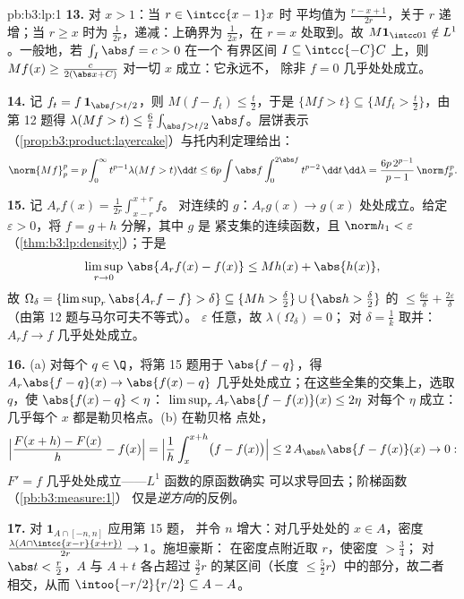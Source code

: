 \begin{solution}{pb:b3:lp:1}
\textbf{13.} 对 $x > 1$：当 $r \in \intcc{x-1}x$ 时
平均值为 $\frac{r - x + 1}{2r}$，关于 $r$ 递增；当 $r
\geq x$ 时为 $\frac1{2r}$，递减：上确界为
$\frac1{2x}$，在 $r = x$ 处取到。故 $M\mathbf 1_{\intcc01}
\notin L^1$。一般地，若 $\int_I\abs f = c > 0$ 在一个
有界区间 $I \subseteq \intcc{-C}C$ 上，则 $Mf(x) \geq
\frac{c}{2(\abs x + C)}$ 对一切 $x$ 成立：它永远不，
除非 $f = 0$ 几乎处处成立。

\textbf{14.} 记 $f_t = f\,\mathbf 1_{\abs f > t/2}$，则
$M(f - f_t) \leq \frac t2$，于是 $\{Mf > t\} \subseteq \{Mf_t
> \frac t2\}$，由第 12 题得 $\lambda(Mf > t) \leq
\frac6t\int_{\abs f > t/2}\abs f$。层饼表示
（\cref{prop:b3:product:layercake}）与托内利定理给出：
\[
\norm{Mf}_p^p = p\int_0^\infty t^{p-1}\lambda(Mf > t)\dd t
\leq 6p\int\abs f\int_0^{2\abs f}t^{p-2}\,\dd t\,\dd\lambda
= \frac{6p\,2^{p-1}}{p-1}\,\norm f_p^p .
\]

\textbf{15.} 记 $A_rf(x) = \frac1{2r}\int_{x-r}^{x+r}f$。
对连续的 $g$：$A_rg(x) \to g(x)$ 处处成立。给定
$\varepsilon > 0$，将 $f = g + h$ 分解，其中 $g$ 是
紧支集的连续函数，且 $\norm h_1 < \varepsilon$
（\cref{thm:b3:lp:density}）；于是
\[
\limsup_{r\to0}\,\abs{A_rf(x) - f(x)} \leq Mh(x) +
\abs{h(x)},
\]
故 $\Omega_\delta = \{\limsup_r\abs{A_rf - f} > \delta\}
\subseteq \{Mh > \tfrac\delta2\} \cup \{\abs h >
\tfrac\delta2\}$ 的 $\leq \frac{6\varepsilon}\delta
+ \frac{2\varepsilon}\delta$（由第 12 题与马尔可夫不等式）。
$\varepsilon$ 任意，故 $\lambda(\Omega_\delta) = 0$；
对 $\delta = \frac1k$ 取并：$A_rf \to f$ 几乎处处成立。

\textbf{16.} (a) 对每个 $q \in \Q$，将第 15 题用于
$\abs{f - q}$，得 $A_r\abs{f - q}(x) \to \abs{f(x) - q}$
几乎处处成立；在这些全集的交集上，选取
$q$，使 $\abs{f(x) - q} < \eta$：
$\limsup_rA_r\abs{f - f(x)}(x) \leq 2\eta$ 对每个 $\eta$ 成立：
几乎每个 $x$ 都是勒贝格点。(b) 在勒贝格
点处，
\[
\Bigl|\frac{F(x + h) - F(x)}h - f(x)\Bigr|
= \Bigl|\frac1h\int_x^{x+h}\bigl(f - f(x)\bigr)\Bigr|
\leq 2\,A_{\abs h}\abs{f - f(x)}(x) \to 0 :
\]
$F' = f$ 几乎处处成立——$L^1$ 函数的原函数确实
可以求导回去；阶梯函数（\cref{pb:b3:measure:1}）
仅是\emph{逆方向}的反例。

\textbf{17.} 对 $\mathbf 1_{A\cap[-n,n]}$ 应用第 15 题，
并令 $n$ 增大：对几乎处处的 $x \in A$，密度
$\frac{\lambda(A\cap\intcc{x-r}{x+r})}{2r} \to 1$。施坦豪斯：
在密度点附近取 $r$，使密度 $> \frac34$；
对 $\abs t < \frac r2$，$A$ 与 $A + t$ 各占超过
$\frac32r$ 的某区间（长度 $\leq \frac52r$）中的部分，故二者
相交，从而 $\intoo{-r/2}{r/2} \subseteq A - A$。


\end{solution}
